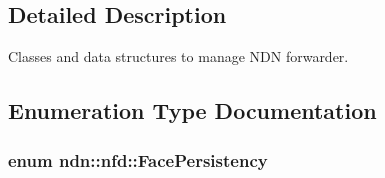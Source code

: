 \subsection{Detailed Description}
Classes and data structures to manage N\+DN forwarder. 



\subsection{Enumeration Type Documentation}
\subsubsection[{\texorpdfstring{Face\+Persistency}{FacePersistency}}]{\setlength{\rightskip}{0pt plus 5cm}enum {\bf ndn\+::nfd\+::\+Face\+Persistency}}\hypertarget{group__management_ga05df4b7c484a0fae25d3e65962511bac}{}\label{group__management_ga05df4b7c484a0fae25d3e65962511bac}
